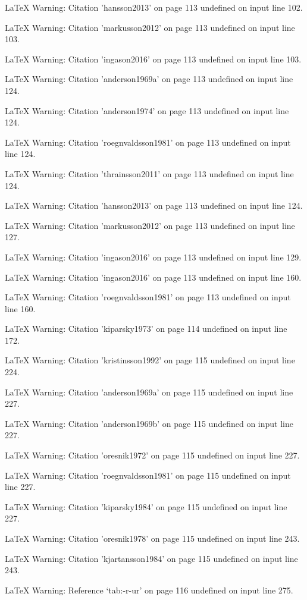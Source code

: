 LaTeX Warning: Citation 'hansson2013' on page 113 undefined on input line 102.


LaTeX Warning: Citation 'markusson2012' on page 113 undefined on input line 103.


LaTeX Warning: Citation 'ingason2016' on page 113 undefined on input line 103.


LaTeX Warning: Citation 'anderson1969a' on page 113 undefined on input line 124.


LaTeX Warning: Citation 'anderson1974' on page 113 undefined on input line 124.


LaTeX Warning: Citation 'roegnvaldsson1981' on page 113 undefined on input line 124.


LaTeX Warning: Citation 'thrainsson2011' on page 113 undefined on input line 124.


LaTeX Warning: Citation 'hansson2013' on page 113 undefined on input line 124.


LaTeX Warning: Citation 'markusson2012' on page 113 undefined on input line 127.


LaTeX Warning: Citation 'ingason2016' on page 113 undefined on input line 129.


LaTeX Warning: Citation 'ingason2016' on page 113 undefined on input line 160.


LaTeX Warning: Citation 'roegnvaldsson1981' on page 113 undefined on input line 160.


LaTeX Warning: Citation 'kiparsky1973' on page 114 undefined on input line 172.


LaTeX Warning: Citation 'kristinsson1992' on page 115 undefined on input line 224.


LaTeX Warning: Citation 'anderson1969a' on page 115 undefined on input line 227.


LaTeX Warning: Citation 'anderson1969b' on page 115 undefined on input line 227.


LaTeX Warning: Citation 'oresnik1972' on page 115 undefined on input line 227.


LaTeX Warning: Citation 'roegnvaldsson1981' on page 115 undefined on input line 227.


LaTeX Warning: Citation 'kiparsky1984' on page 115 undefined on input line 227.


LaTeX Warning: Citation 'oresnik1978' on page 115 undefined on input line 243.


LaTeX Warning: Citation 'kjartansson1984' on page 115 undefined on input line 243.


LaTeX Warning: Reference `tab:-r-ur' on page 116 undefined on input line 275.


